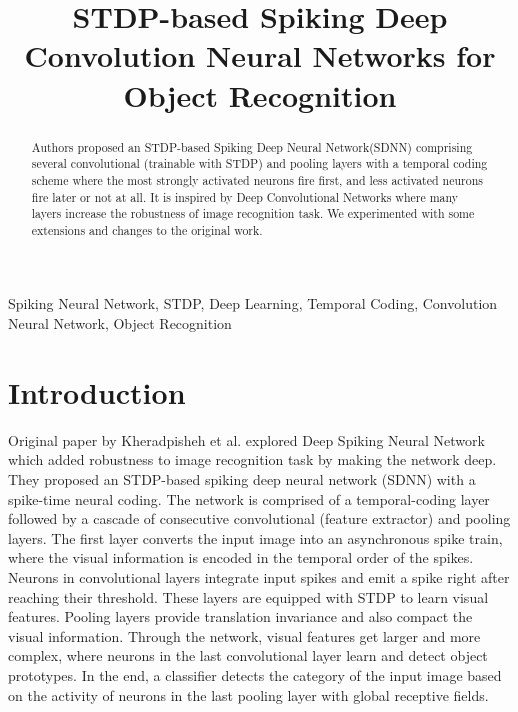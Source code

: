 \documentclass[conference]{IEEEtran}
\begin{document}
\title{STDP-based Spiking Deep Convolution Neural Networks for Object Recognition}

\author{
\and
{}
}

\maketitle

\begin{abstract}
Authors proposed an STDP-based Spiking Deep Neural Network(SDNN) comprising several convolutional (trainable with STDP) and pooling layers with a temporal coding scheme where the most strongly activated neurons fire first, and less activated neurons fire later or not at all. It is inspired by Deep Convolutional Networks where many layers increase the robustness of image recognition task. We experimented with some extensions and changes to the original work.
\end{abstract}

\begin{IEEEkeywords}
Spiking Neural Network, STDP, Deep Learning, Temporal Coding, Convolution Neural Network, Object Recognition
\end{IEEEkeywords}

\section{Introduction}
Original paper\cite{orig} by Kheradpisheh et al. explored Deep Spiking Neural Network which added robustness to image recognition task by making the network deep. They proposed an STDP-based spiking deep neural network (SDNN) with a spike-time neural coding. The network is comprised of a temporal-coding layer followed by a cascade of consecutive convolutional (feature extractor) and pooling layers. The first layer converts the input image into an asynchronous spike train, where the visual information is encoded in the temporal order of the spikes. Neurons in convolutional layers integrate input spikes and emit a spike right after reaching their threshold. These layers are equipped with STDP to learn visual features. Pooling layers provide translation invariance and also compact the visual information. Through the network, visual features get larger and more complex, where neurons in the last convolutional layer learn and detect object prototypes. In the end, a classifier detects the category of the input image based on the activity of neurons in the last pooling layer with global receptive fields.
\end{document}
